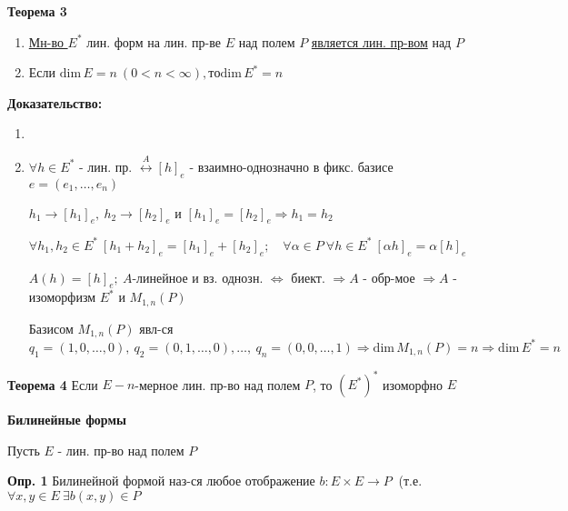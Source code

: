 \textbf{Теорема 3}
\begin{enumerate}
 \item \underline{Мн-во $E^*$} лин. форм на лин. пр-ве $E$ над полем $P$ \underline{является лин. пр-вом} над $P$
 \item Если $\mathrm{dim}\, E = n\ (0 < n <\infty), то \mathrm{dim}\, E^* = n$
\end{enumerate}

\textbf{Доказательство:}
\begin{enumerate}
 \item %
 \item $\forall h \in E^*$ - лин. пр. $\overset{A}\leftrightarrow [h]_e$ - взаимно-однозначно в фикс. базисе $e=(e_1, \ldots, e_n)$

    $h_1 \to [h_1]_e,\ h_2\to [h_2]_e$ и $[h_1]_e = [h_2]_e \Rightarrow h_1 = h_2$

    $\forall h_1, h_2 \in E^*\ [h_1 + h_2]_e = [h_1]_e + [h_2]_e;\quad \forall \alpha \in P\ \forall h\in E^*\ [\alpha h]_e = \alpha [h]_e$

    $A(h) = [h]_e;\ A$-линейное и вз. однозн. $\Leftrightarrow$ биект. $\Rightarrow A$ - обр-мое $\Rightarrow A$ - изоморфизм $E^*$ и $M_{1,n}(P)$

    Базисом $M_{1,n}(P)$ явл-ся $q_1=(1,0,\ldots,0),\ q_2=(0,1,\ldots,0),\ldots,\ q_n = (0,0,\ldots, 1) \Rightarrow \mathrm{dim}\, M_{1,n} (P) = n \Rightarrow \mathrm{dim}\, E^* = n$
\end{enumerate}

\textbf{Теорема 4} Если $E-n$-мерное лин. пр-во над полем $P$, то $(E^*)^*$ изоморфно $E$\\

\begin{center}
 \textbf{Билинейные формы}
\end{center}
Пусть $E$ - лин. пр-во над полем $P$

\textbf{Опр. 1} Билинейной формой наз-ся любое отображение $b : E \times E \to P\ $ (т.е. $\forall x,y\in E\ \exists b(x,y)\in P$

 









